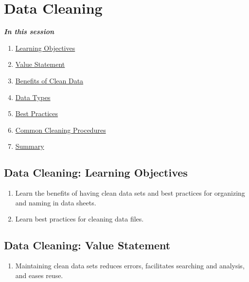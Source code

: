 \documentclass[
]{book}
\providecommand{\tightlist}{%
  \setlength{\itemsep}{0pt}\setlength{\parskip}{0pt}}
\begin{document}
\hypertarget{data-cleaning}{%
\section{Data Cleaning}\label{data-cleaning}}

\textbf{\emph{In this session }}

\begin{enumerate}
\def\labelenumi{\arabic{enumi}.}
\tightlist
\item
  \protect\hyperlink{data-cleaning-learning-objectives}{Learning Objectives}
\item
  \protect\hyperlink{data-cleaning-value-statement}{Value Statement}
\item
  \protect\hyperlink{benefits-of-clean-data}{Benefits of Clean Data}
\item
  \protect\hyperlink{data-types}{Data Types}
\item
  \protect\hyperlink{data-cleaning-best-practices}{Best Practices}
\item
  \protect\hyperlink{common-cleaning-procedures}{Common Cleaning Procedures}
\item
  \protect\hyperlink{data-cleaning-summary}{Summary}
\end{enumerate}

\hypertarget{data-cleaning-learning-objectives}{%
\subsection{Data Cleaning: Learning Objectives}\label{data-cleaning-learning-objectives}}

\begin{enumerate}
\def\labelenumi{\arabic{enumi}.}
\item
  Learn the benefits of having clean data sets and best practices for organizing and naming in data sheets.
\item
  Learn best practices for cleaning data files.
\end{enumerate}

\hypertarget{data-cleaning-value-statement}{%
\subsection{Data Cleaning: Value Statement}\label{data-cleaning-value-statement}}

\begin{enumerate}
\def\labelenumi{\arabic{enumi}.}
\tightlist
\item
  Maintaining clean data sets reduces errors, facilitates searching and analysis, and eases reuse.
\end{enumerate}
\end{document}
